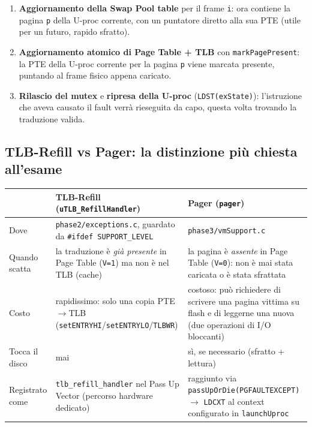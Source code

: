 \documentclass[11pt,a4paper]{article}
\newcommand{\code}[1]{\texttt{#1}}
\begin{document}
\begin{enumerate}
  store \emph{della U-proc corrente} il blocco \code{p} nel frame appena
  liberato (\code{flashOperation(sup->sup\_asid, p, fa, FLASHREAD)}); stesso
  trattamento in caso di errore.
\item \textbf{Aggiornamento della Swap Pool table} per il frame \code{i}:
  ora contiene la pagina \code{p} della U-proc corrente, con un puntatore
  diretto alla sua PTE (utile per un futuro, rapido sfratto).
\item \textbf{Aggiornamento atomico di Page Table + TLB} con
  \code{markPagePresent}: la PTE della U-proc corrente per la pagina
  \code{p} viene marcata presente, puntando al frame fisico appena
  caricato.
\item \textbf{Rilascio del mutex} e \textbf{ripresa della U-proc}
  (\code{LDST(exState)}): l'istruzione che aveva causato il fault verrà
  rieseguita da capo, questa volta trovando la traduzione valida.
\end{enumerate}

\subsection{TLB-Refill vs Pager: la distinzione più chiesta all'esame}
\label{sub:tlbrefill-vs-pager}
\begin{center}
\begin{tabular}{@{}lp{5.6cm}p{5.6cm}@{}}
\toprule
 & \textbf{TLB-Refill (\code{uTLB\_RefillHandler})} & \textbf{Pager (\code{pager})} \\
\midrule
Dove & \code{phase2/exceptions.c}, guardato da \code{\#ifdef SUPPORT\_LEVEL} &
  \code{phase3/vmSupport.c} \\
Quando scatta & la traduzione è \emph{già presente} in Page Table
  (\code{V=1}) ma non è nel TLB (cache) & la pagina è \emph{assente} in Page
  Table (\code{V=0}): non è mai stata caricata o è stata sfrattata \\
Costo & rapidissimo: solo una copia PTE$\to$TLB
  (\code{setENTRYHI}/\code{setENTRYLO}/\code{TLBWR}) & costoso: può
  richiedere di scrivere una pagina vittima su flash e di leggerne una
  nuova (due operazioni di I/O bloccanti) \\
Tocca il disco & mai & sì, se necessario (sfratto + lettura) \\
Registrato come & \code{tlb\_refill\_handler} nel Pass Up Vector (percorso
  hardware dedicato) & raggiunto via \code{passUpOrDie(PGFAULTEXCEPT)}
  $\to$ \code{LDCXT} al context configurato in \code{launchUproc} \\
\bottomrule
\end{tabular}
\end{center}
\end{document}
